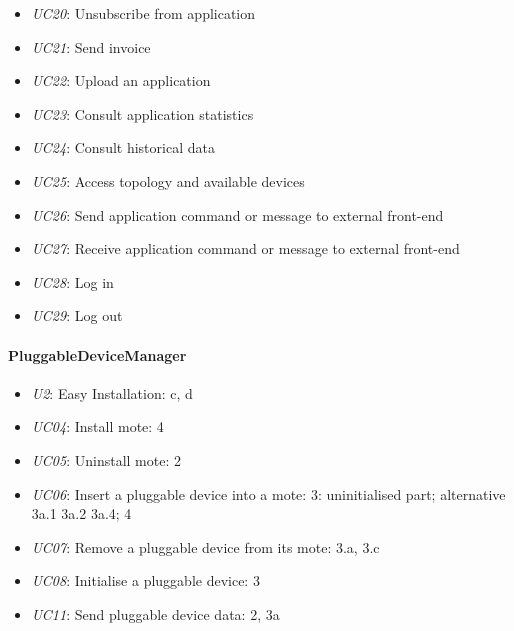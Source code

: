 \begin{itemize}
            \item \emph{UC20}: Unsubscribe from application
            \item \emph{UC21}: Send invoice
            \item \emph{UC22}: Upload an application
            \item \emph{UC23}: Consult application statistics
            \item \emph{UC24}: Consult historical data
            \item \emph{UC25}: Access topology and available devices
            \item \emph{UC26}: Send application command or message to external front-end
            \item \emph{UC27}: Receive application command or message to external front-end
            \item \emph{UC28}: Log in
            \item \emph{UC29}: Log out
        \end{itemize}

    \paragraph{PluggableDeviceManager}
        \begin{itemize}
            \item \emph{U2}: Easy Installation: c, d
            \item \emph{UC04}: Install mote: 4
            \item \emph{UC05}: Uninstall mote: 2
            \item \emph{UC06}: Insert a pluggable device into a mote: 3: uninitialised part; alternative 3a.1 3a.2 3a.4; 4
            \item \emph{UC07}: Remove a pluggable device from its mote: 3.a, 3.c
            \item \emph{UC08}: Initialise a pluggable device: 3
            \item \emph{UC11}: Send pluggable device data: 2, 3a
        \end{itemize}

